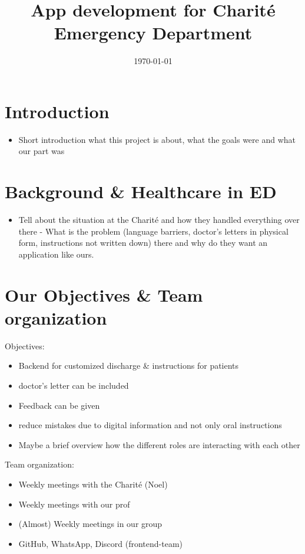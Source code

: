 \documentclass[]{report}
\title{App development for Charité Emergency Department}
\author{}
\date{\today}
\begin{document}
\maketitle

\section{Introduction}
\begin{itemize}
    \item Short introduction what this project is about, what the goals were and what our part was
\end{itemize}

\section{Background \& Healthcare in ED}
\begin{itemize}
    \item Tell about the situation at the Charité and how they handled everything over there - What is the problem (language barriers, doctor's letters in physical form, instructions not written down) there and why do they want an application like ours.
\end{itemize}

\section{Our Objectives \& Team organization}
Objectives:
\begin{itemize}
    \item Backend for customized discharge \& instructions for patients
    \item doctor's letter can be included
    \item Feedback can be given
    \item reduce mistakes due to digital information and not only oral instructions
    \item Maybe a brief overview how the different roles are interacting with each other
\end{itemize}
Team organization:
\begin{itemize}
    \item Weekly meetings with the Charité (Noel)
    \item Weekly meetings with our prof
    \item (Almost) Weekly meetings in our group
    \item GitHub, WhatsApp, Discord (frontend-team)
\end{itemize}
\end{document}
